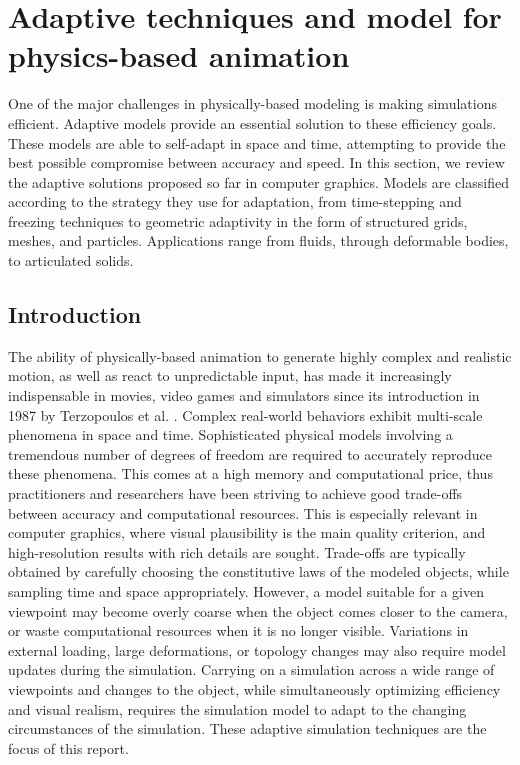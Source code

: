 
\section{Adaptive techniques and model for physics-based animation}
\label{sec:starAdaptivity}
One of the major challenges in physically-based modeling is making simulations efficient. Adaptive models provide an essential solution to these efficiency goals. These models are able to self-adapt in space and time, attempting to provide the best possible compromise between accuracy and speed.
In this section, we review the adaptive solutions proposed so far in computer graphics. Models are classified according to the strategy they use for adaptation, from time-stepping and freezing techniques to geometric adaptivity in the form of structured grids, meshes, and particles. Applications range from fluids, through deformable bodies, to articulated solids.

\subsection{Introduction}
The ability of physically-based animation to generate highly complex and realistic motion, as well as react to unpredictable input, has made it increasingly indispensable in movies, video games and simulators since its introduction in 1987 by Terzopoulos et al. \cite{Terzopoulos1987}.
Complex real-world behaviors exhibit multi-scale phenomena in space and time.
Sophisticated physical models involving a tremendous number of degrees of freedom are required to accurately reproduce these phenomena.
This comes at a high memory and computational price, thus practitioners and researchers have been striving to achieve good trade-offs between accuracy and computational resources.
This is especially relevant in computer graphics, where visual plausibility is the main quality criterion, and high-resolution results with rich details are sought.
Trade-offs are typically obtained by carefully choosing the constitutive laws of the modeled objects, while sampling time and space appropriately.
However, a model suitable for a given viewpoint may become overly coarse when the object comes closer to the camera, or waste computational resources when it is no longer visible. Variations in external loading, large deformations, or topology changes may also require model updates during the simulation.
Carrying on a simulation across a wide range of viewpoints and changes to the object, while simultaneously optimizing efficiency and visual realism, requires the simulation model to adapt to the changing circumstances of the simulation.
These adaptive simulation techniques are the focus of this report.

